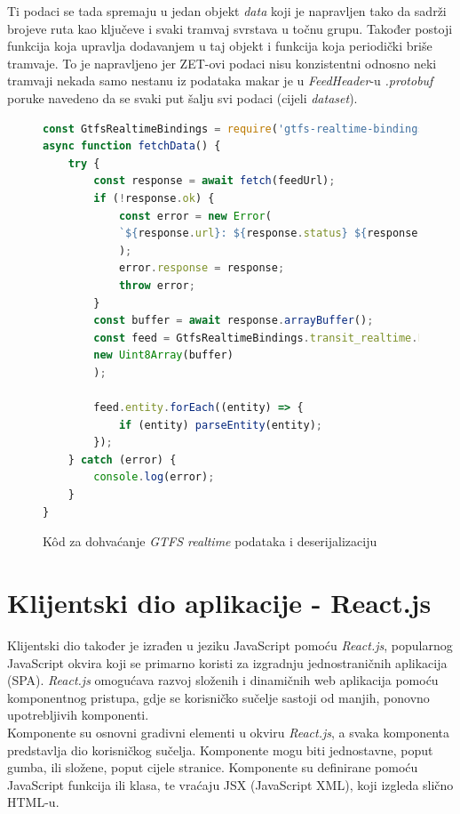 \documentclass[zavrsnirad]{fer}
\begin{document}
Ti podaci se tada spremaju u jedan objekt \textit{data} koji je napravljen tako da sadrži brojeve ruta kao ključeve i svaki tramvaj svrstava u točnu grupu. Također postoji funkcija koja upravlja dodavanjem u taj objekt i funkcija koja periodički briše tramvaje. To je napravljeno jer ZET-ovi podaci nisu konzistentni odnosno neki tramvaji nekada samo nestanu iz podataka makar je u \textit{FeedHeader}-u \textit{.protobuf} poruke navedeno da se svaki put šalju svi podaci (cijeli \textit{dataset}).

\begin{figure}[H]
	\centering
	\begin{minipage}{0.9\linewidth}
		\begin{lstlisting}[language=JavaScript]
const GtfsRealtimeBindings = require('gtfs-realtime-bindings');
async function fetchData() {
	try {
		const response = await fetch(feedUrl);
		if (!response.ok) {
			const error = new Error(
			`${response.url}: ${response.status} ${response.statusText}`
			);
			error.response = response;
			throw error;
		}
		const buffer = await response.arrayBuffer();
		const feed = GtfsRealtimeBindings.transit_realtime.FeedMessage.decode(
		new Uint8Array(buffer)
		);
		
		feed.entity.forEach((entity) => {
			if (entity) parseEntity(entity);
		});
	} catch (error) {
		console.log(error);
	}
}
		\end{lstlisting}
	\end{minipage}
	\caption{K\^od za dohvaćanje \textit{GTFS realtime} podataka i deserijalizaciju}
	\label{slk:dohvatGTFS}
\end{figure}
\newpage

\section{Klijentski dio aplikacije - React.js}
\label{sec:frontend}

Klijentski dio također je izrađen u jeziku JavaScript pomoću \textit{React.js}, popularnog JavaScript okvira koji se primarno koristi za izgradnju jednostraničnih aplikacija (SPA). \textit{React.js} omogućava razvoj složenih i dinamičnih web aplikacija pomoću komponentnog pristupa, gdje se korisničko sučelje sastoji od manjih, ponovno upotrebljivih komponenti.\\
Komponente su osnovni gradivni elementi u okviru \textit{React.js}, a svaka komponenta predstavlja dio korisničkog sučelja. Komponente mogu biti jednostavne, poput gumba, ili složene, poput cijele stranice. Komponente su definirane pomoću JavaScript funkcija ili klasa, te vraćaju JSX (JavaScript XML), koji izgleda slično HTML-u.\\
\end{document}
